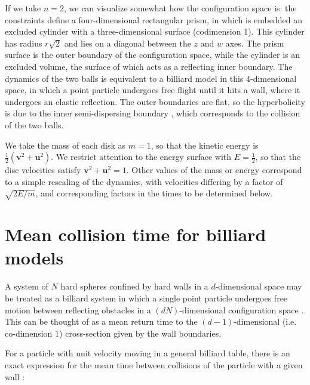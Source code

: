 \documentclass[superscriptaddress,pre,reprint,showpacs,twocolumn]{revtex4-1}
\begin{document}
If we take $n=2$, we can visualize somewhat how the
configuration space is: the constraints define a four-dimensional
rectangular prism, in which is embedded an excluded cylinder with a three-dimensional surface
(codimension 1).
This cylinder has radius $r\sqrt{2}$ and lies
on a diagonal between the $z$ and $w$ axes.
The prism surface is the outer boundary of the configuration space,
while the cylinder is an excluded volume, the surface of which
acts as a reflecting inner boundary.
The dynamics of the two balls is
equivalent to a billiard model in this 4-dimensional space, in which 
a point particle undergoes free flight until
it hits a wall, where it undergoes an elastic reflection.
The outer boundaries are flat, so the
hyperbolicity is due to the inner semi-dispersing
boundary \cite{Sim99}, which corresponds to the collision of
the two balls.


We take the mass of each disk as $m=1$, so that the kinetic energy
is $\frac{1}{2}(\mathbf{v}^2 + \mathbf{u}^2)$. We restrict attention to the energy surface with
$E = \frac{1}{2}$, so that the disc velocities satisfy $\mathbf{v}^2 + \mathbf{u}^2 = 1$.
Other values of the mass or energy correspond to a simple rescaling of the dynamics, with velocities differing
by a factor of
$\sqrt{2E/m}$, and corresponding factors in the times to be determined below.




\section{Mean collision time for billiard models}

\label{knownfacts}

A system of $N$ hard spheres confined by hard walls in a $d$-dimensional
space may be treated as a billiard system 
in which a single point  particle undergoes free motion between reflecting obstacles 
in a $ (d N) $-dimensional configuration space \cite{Sinai70, Sim99, MarkChern}. 
This can be thought of as a mean return time to the $(d-1)$-dimensional 
(i.e. co-dimension $1$) cross-section given by the wall boundaries.

For a particle with unit velocity moving in a general billiard table, there is 
an exact expression for the mean time between 
collisions of the particle with a given wall \cite{Chernov97}:
\end{document}
